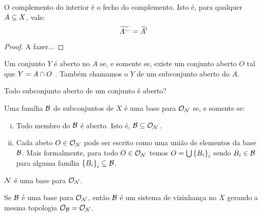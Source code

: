 \documentclass[a4paper,12pt,oneside]{book}
\begin{document}
\begin{theorem}
	\label{thm:interior-fecho}
	O complemento do interior é o fecho do complemento. Isto é, para qualquer $A \subseteq X$, vale:
	\[
		\widetilde{A^{\smile}} = \widetilde{A}^{\prime}
	\]
\end{theorem}

\begin{proof}
	A fazer...
\end{proof}

\begin{definition}
	\label{def:subconjunto-aberto}
	Um conjunto $Y$ é aberto no $A$ se, e somente se, existe um conjunto aberto $O$ tal que $Y = A \cap O$ . Também chamamos o $Y$ de um subconjunto aberto do $A$.
\end{definition}

\begin{question}
	Todo subconjunto aberto de um conjunto é aberto?
\end{question}

\begin{definition}[Base]
	\label{def:base}
	Uma família $\mathcal{B}$ de subconjuntos de $X$ é uma base para $\mathcal{O}_{\mathcal{N}}$ se, e somente se:
	\begin{enumerate}[i)]
		\item Todo membro do $\mathcal{B}$ é aberto. Isto é, $\mathcal{B} \subseteq \mathcal{O}_{\mathcal{N}}$.
		\item Cada abeto $O \in \mathcal{O}_{\mathcal{N}}$ pode ser escrito como uma união de elementos da base $\mathcal{B}$. Mais formalmente, para todo $O \in \mathcal{O}_{\mathcal{N}}$ temos $O = \bigcup \left\{B_{i}\right\}_{i}$ sendo $B_i \in \mathcal{B}$ para alguma família $\left\{B_{i}\right\}_{i} \subseteq \mathcal{B}$.
	\end{enumerate}
\end{definition}

\begin{fact}
	$\mathcal{N}$ é uma base para $\mathcal{O}_{\mathcal{N}}$.
\end{fact}

\begin{theorem}
	Se $\mathcal{B}$ é uma base para $\mathcal{O}_{\mathcal{N}}$, então $\mathcal{B}$ é um sistema de vizinhança no $X$ gerando a mesma topologia $\mathcal{O}_{\mathcal{B}} = \mathcal{O}_{\mathcal{N}}$.
\end{theorem}
\end{document}

